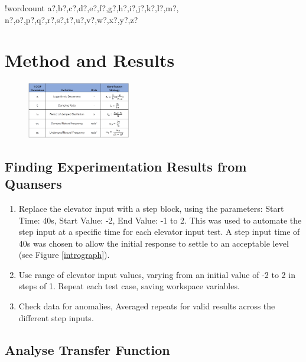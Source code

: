 \documentclass[11pt]{article}
\newcounter{words}
\newenvironment{counted}{%
  \setcounter{words}{0}
  \SearchList!{wordcount}{\stepcounter{words}}
    {a?,b?,c?,d?,e?,f?,g?,h?,i?,j?,k?,l?,m?,
    n?,o?,p?,q?,r?,s?,t?,u?,v?,w?,x?,y?,z?}
  \UndoBoundary{'}
  \SearchOrder{p;}}{%
  \StopSearching}
\begin{document}
\begin{counted}
\section{Method and Results}\label{method-and-results}

\begin{figure}
  \vspace{0pt}
  \begin{center}
  \includegraphics[trim = 0 0 0 0, clip, width=0.4\textwidth]{eqtable.pdf}
\end{center}
\label{eqtable}
  \vspace{0pt}
\end{figure}

\subsection{Finding Experimentation Results from
Quansers}\label{finding-experimentation-results-from-quansers}

\begin{enumerate}

\item
  Replace the elevator input with a step block, using the parameters:
  Start Time: 40s, Start Value: -2, End Value: -1 to 2. This was used to
  automate the step input at a specific time for each elevator input
  test. A step input time of 40s was chosen to allow the initial
  response to settle to an acceptable level (see Figure
  \ref{intrograph}).
\item
  Use range of elevator input values, varying from an initial value of
  -2 to 2 in steps of 1. Repeat each test case, saving workspace
  variables.
\item
  Check data for anomalies, Averaged repeats for valid results across
  the different step inputs.
\end{enumerate}

\subsection{Analyse Transfer Function}\label{analyse-transfer-function}


\end{counted}
\end{document}
